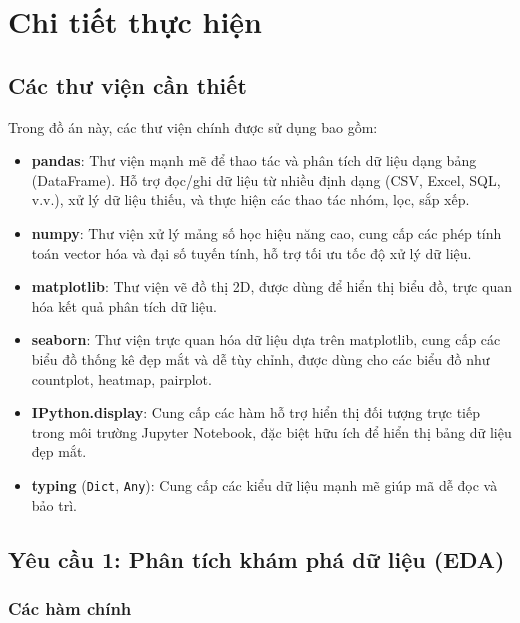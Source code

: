\section{Chi tiết thực hiện}
\subsection{Các thư viện cần thiết}
Trong đồ án này, các thư viện chính được sử dụng bao gồm:
\begin{itemize}
	\item \textbf{pandas}: Thư viện mạnh mẽ để thao tác và phân tích dữ liệu dạng bảng (DataFrame). Hỗ trợ đọc/ghi dữ liệu từ nhiều định dạng (CSV, Excel, SQL, v.v.), xử lý dữ liệu thiếu, và thực hiện các thao tác nhóm, lọc, sắp xếp.
	\item \textbf{numpy}: Thư viện xử lý mảng số học hiệu năng cao, cung cấp các phép tính toán vector hóa và đại số tuyến tính, hỗ trợ tối ưu tốc độ xử lý dữ liệu.
	\item \textbf{matplotlib}: Thư viện vẽ đồ thị 2D, được dùng để hiển thị biểu đồ, trực quan hóa kết quả phân tích dữ liệu.
	\item \textbf{seaborn}: Thư viện trực quan hóa dữ liệu dựa trên matplotlib, cung cấp các biểu đồ thống kê đẹp mắt và dễ tùy chỉnh, được dùng cho các biểu đồ như countplot, heatmap, pairplot.
	\item \textbf{IPython.display}: Cung cấp các hàm hỗ trợ hiển thị đối tượng trực tiếp trong môi trường Jupyter Notebook, đặc biệt hữu ích để hiển thị bảng dữ liệu đẹp mắt.
	\item \textbf{typing} (\texttt{Dict}, \texttt{Any}): Cung cấp các kiểu dữ liệu mạnh mẽ giúp mã dễ đọc và bảo trì.
\end{itemize}

\subsection{Yêu cầu 1: Phân tích khám phá dữ liệu (EDA)}
\subsubsection{Các hàm chính}

